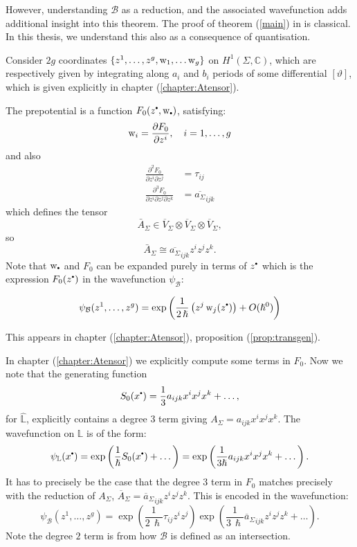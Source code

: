     However, understanding \( \mathcal{B}\) as a reduction, and the associated wavefunction adds additional insight into this theorem. The proof of theorem (\ref{main}) in \cite{bhuespe} is classical. In this thesis, we understand this also as a consequence of quantisation.
    
    Consider \(2g\) coordinates \( \{z^1, \dots , z^g, \mathrm{w}_1, \dots \mathrm{w}_g \}\) on \(H^1(\Sigma, \mathbb{C})\), which are respectively given by integrating along \(a_i\) and \(b_i\) periods of some differential \( [\vartheta]\), which is given explicitly in chapter (\ref{chapter:Atensor}).

    The prepotential is a function \(F_0(z^{\sbt},\w_{\sbt})\), satisfying:
    \[ \mathrm{w}_i=\frac{\partial F_0}{\partial z^i},\quad i=1,\dots,g \]
    and also 
    \begin{align*} \frac{\partial^2 F_0}{\partial z^i\partial z^j}&=\tau_{ij} \\ 
    \frac{\partial^3 F_0}{\partial z^i\partial z^j\partial z^k}&=\overline{{a_\Sigma}}_{ijk}
    \end{align*}
    which defines the tensor \[ \bar{A}_\Sigma\in\overline{V}_\Sigma\otimes\overline{V}_\Sigma\otimes\overline{V}_\Sigma,\]
    so 
    \[\bar{A}_\Sigma \cong \overline{{a_\Sigma}}_{ijk} z^i z^j z^k. \]
    Note that \(\w_{\sbt}\) and \(F_0\) can be expanded purely in terms of \(z^{\sbt}\) which is the expression \(F_0(z^{\sbt})\) in the wavefunction \( \psi_{\mathcal{B}}\):
    \begin{prop}
    \begin{equation}
        \psi_{\mathcal{B}}(z^1, \dots,z^g) = \exp \left( \frac{1}{2\, \hslash} \left(  z^j \, \w_j(z^{\sbt}) \right)+ O(\hslash^0) \right) 
    \end{equation}
    \end{prop}
    This appears in chapter (\ref{chapter:Atensor}), proposition (\ref{prop:transgen}).
    
    In chapter (\ref{chapter:Atensor}) we explicitly compute some terms in \(F_0\).
    Now we note that the generating function \[S_0(x^{\sbt}) =\frac{1}{3} a_{ijk} x^i x^j x^k + \dots, \] for \( \widehat{\mathbb{L}} \), explicitly contains a degree \(3\) term giving \( A_\Sigma = a_{ijk}x^i x^j x^k\). The wavefunction on \( \mathbb{L}\) is of the form:
    \[ \psi_{\mathbb{L}}(x^{\sbt}) = \exp\left( \frac{1}{\hslash} S_0(x^{\sbt}) + \dots \right) = \exp \left( \frac{1}{3 \hslash} a_{ijk}x^i x^j x^k + \dots \right). \]
    It has to precisely be the case that the degree \(3\) term in \(F_0\) matches precisely with the reduction of \(A_\Sigma\), \( \overline{A}_\Sigma = {\overline{a}_\Sigma}_{ijk} z^i z^j z^k\). This is encoded in the wavefunction:
    \[ \psi_{\mathcal{B}}(z^1, \dots,z^g) = \exp\left( \frac{1}{2\, \hslash} \tau_{ij}  z^i z^j \right) \exp \left(  \frac{1}{3\, \hslash} {\overline{a}_\Sigma}_{ijk} z^i z^j z^k + \dots \right). \]
    Note the degree \(2\) term is from how \( \mathcal{B}\) is defined as an intersection. 
    
